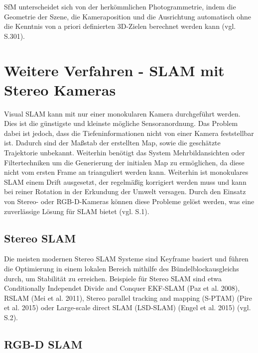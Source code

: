 SfM unterscheidet sich von der herkömmlichen Photogrammetrie, indem die Geometrie der Szene, die Kameraposition und die Ausrichtung automatisch ohne die Kenntnis von a priori definierten 3D-Zielen berechnet werden kann (vgl. \cite{sfm_photo} S.301).

\section{Weitere Verfahren - SLAM mit Stereo Kameras}

Visual SLAM kann mit nur einer monokularen Kamera durchgeführt werden. Dies ist die günstigste und kleinste mögliche Sensoranordnung. Das Problem dabei ist jedoch, dass die Tiefeninformationen nicht von einer Kamera feststellbar ist. Dadurch sind der Maßstab der erstellten Map, sowie die geschätzte Trajektorie unbekannt. Weiterhin benötigt das System Mehrbildansichten oder Filtertechniken um die Generierung der initialen Map zu ermöglichen, da diese nicht vom ersten Frame an trianguliert werden kann. Weiterhin ist monokulares SLAM einem Drift ausgesetzt, der regelmäßig korrigiert werden muss und kann bei reiner Rotation in der Erkundung der Umwelt versagen. Durch den Einsatz von Stereo- oder RGB-D-Kameras können diese Probleme gelöst werden, was eine zuverlässige Lösung für SLAM bietet (vgl. \cite{orbslam2} S.1).

\subsection{Stereo SLAM}

Die meisten modernen Stereo SLAM Systeme sind Keyframe basiert und führen die Optimierung in einem lokalen Bereich mithilfe des Bündelblockausgleichs durch, um Stabilität zu erreichen. Beispiele für Stereo SLAM sind etwa \glqq Conditionally Independet Divide and Conquer EKF-SLAM\grqq{} (Paz et al. 2008), \glqq RSLAM\grqq{} (Mei et al. 2011), \glqq Stereo parallel tracking and mapping (S-PTAM)\grqq{} (Pire et al. 2015) oder \glqq Large-scale direct SLAM (LSD-SLAM)\grqq{} (Engel et al. 2015) (vgl. \cite{orbslam2} S.2).

\subsection{RGB-D SLAM}

